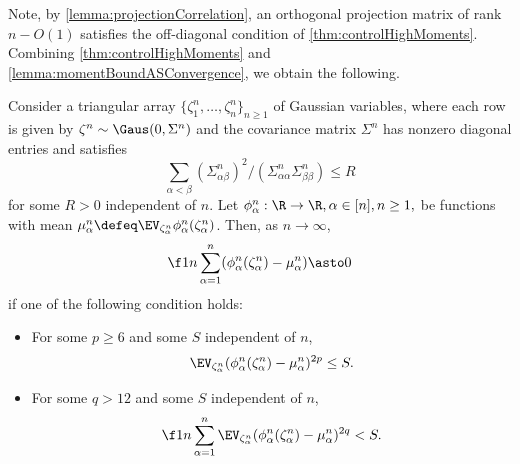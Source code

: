 \documentclass[main.tex]{subfiles}
\begin{document}
Note, by \cref{lemma:projectionCorrelation}, an orthogonal projection matrix of rank $n - O(1)$ satisfies the off-diagonal condition of \cref{thm:controlHighMoments}.
Combining \cref{thm:controlHighMoments} and \cref{lemma:momentBoundASConvergence}, we obtain the following.
\begin{cor}
  \label{thm:StrongLLNGaussianImage} Consider a triangular array $\{\zeta_{1}^{n},\ldots,\zeta_{n}^{n}\}_{n\ge1}$ of Gaussian variables, where each row is given by $\zeta^{n}\sim\Gaus(0,\Sigma^{n})$ and the covariance matrix $\Sigma^{n}$ has nonzero diagonal entries and satisfies
  \[\sum_{\alpha<\beta}(\Sigma_{\alpha\beta}^{n})^{2} / (\Sigma_{\alpha\alpha}^n \Sigma_{\beta\beta}^n)\le R\]
  for some $R > 0$ independent of $n$.
  Let $\phi^n_\alpha:\R\to\R, \alpha\in[n], n \ge1,$ be functions with mean $\mu_\alpha^n \defeq \EV_{\zeta_\alpha^n} \phi^n_\alpha(\zeta^n_\alpha)$.
  Then, as $n\to\infty$,
  \begin{align*}
    \f 1 n \sum_{\alpha=1}^n (\phi^n_\alpha(\zeta^n_\alpha) - \mu^n_\alpha) \asto 0
  \end{align*}
  if one of the following condition holds:
  \begin{itemize}
    \item For some $p \ge 6$ and some $S$ independent of $n$,
    \[\EV_{\zeta^n_\alpha} (\phi^n_\alpha(\zeta^n_\alpha) - \mu^n_\alpha)^{2p} \le S.\]
    \item For some $q > 12$ and some $S$ independent of $n$,
    \[\f 1 n \sum_{\alpha=1}^n \EV_{\zeta^n_\alpha} (\phi^n_\alpha(\zeta^n_\alpha) - \mu^n_\alpha)^{2q} < S.\]
  \end{itemize}

 \end{cor}
\end{document}
